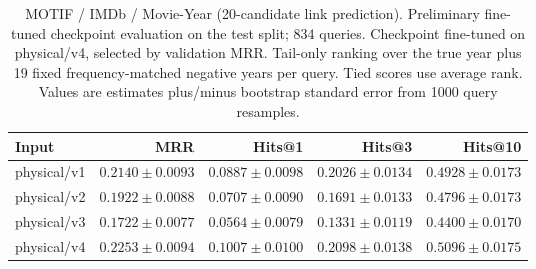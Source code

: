 \begin{table}[t]
\centering
\small
\begin{tabular}{lrrrr}
\toprule
Input & MRR & Hits@1 & Hits@3 & Hits@10 \\
\midrule
physical/v1 & $0.2140 \pm 0.0093$ & $0.0887 \pm 0.0098$ & $0.2026 \pm 0.0134$ & $0.4928 \pm 0.0173$ \\
physical/v2 & $0.1922 \pm 0.0088$ & $0.0707 \pm 0.0090$ & $0.1691 \pm 0.0133$ & $0.4796 \pm 0.0173$ \\
physical/v3 & $0.1722 \pm 0.0077$ & $0.0564 \pm 0.0079$ & $0.1331 \pm 0.0119$ & $0.4400 \pm 0.0170$ \\
physical/v4 & $0.2253 \pm 0.0094$ & $0.1007 \pm 0.0100$ & $0.2098 \pm 0.0138$ & $0.5096 \pm 0.0175$ \\
\bottomrule
\end{tabular}
\caption{MOTIF / IMDb / Movie-Year (20-candidate link prediction). Preliminary fine-tuned checkpoint evaluation on the test split; 834 queries. Checkpoint fine-tuned on physical/v4, selected by validation MRR. Tail-only ranking over the true year plus 19 fixed frequency-matched negative years per query. Tied scores use average rank. Values are estimates plus/minus bootstrap standard error from 1000 query resamples.}
\label{tab:motif-movie_year-link_prediction}
\end{table}
